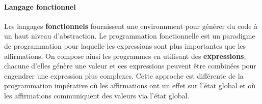 \documentclass{report}
\begin{document}
\begin{multicols*}{3}
    \paragraph{Langage fonctionnel}
    Les langages \textbf{fonctionnels} fournissent une environnment pour générer du code à un 
    haut niveau d'abstraction. Le programmation fonctionnelle est un paradigme de programmation 
    pour laquelle les expressions sont plus importantes que les affirmations. On compose ainsi les 
    programmes en utilisant des \textbf{expressions}; chacune d'elles génère une valeur et ces expressions 
    peuvent être combinées pour engendrer une expression plus complexes. Cette approche est différente de 
    la programmation impérative où les affirmations ont un effet sur l'état global et où les 
    affirmations communiquent des valeurs via l'état global. 
    
   
    \end{multicols*}
\end{document}
